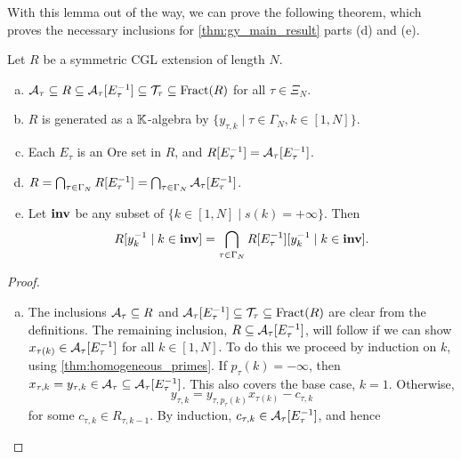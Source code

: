 {With this lemma out of the way, we can prove the following theorem, which proves the
necessary inclusions for \cref{thm:gy_main_result} parts (d) and (e).

\begin{theorem}\label{thm:intersections}
	Let $R$ be a symmetric CGL extension of length $N$.
	\begin{enumerate}[(a)]
		\item $\mathcal{A}_\tau \subseteq R \subseteq \mathcal{A}_\tau[E^{-1}_\tau]\subseteq \mathcal{T}_\tau \subseteq \operatorname{Fract}(R)$ for all $\tau \in \Xi_N$.
		\item $R$ is generated as a $\mathbb{K}$-algebra by $\{y_{\tau, k} \mid \tau \in \Gamma_N, k \in [1, N]\}$.
		\item Each $E_\tau$ is an Ore set in $R$, and $R[E^{-1}_\tau] = \mathcal{A}_\tau[E^{-1}_\tau]$.
		\item $R = \bigcap_{\tau \in \Gamma_N} R[E^{-1}_\tau] = \bigcap_{\tau\in\Gamma_N}\mathcal{A}_\tau[E^{-1}_\tau]$.
		\item Let $\mathbf{inv}$ be any subset of $\{k \in [1, N] \mid s(k) = +\infty \}$. Then
		      \begin{equation*}
			      R[y_k^{-1} \mid k \in \mathbf{inv}] = \bigcap_{\tau \in \Gamma_N} R[E^{-1}_\tau][y^{-1}_k \mid k \in \mathbf{inv}].
		      \end{equation*}
	\end{enumerate}
\end{theorem}
\begin{proof}
	\leavevmode
	\begin{enumerate}[(a)]
		\item The inclusions $\mathcal{A}_\tau \subseteq R$ and $\mathcal{A}_\tau[E^{-1}_\tau] \subseteq \mathcal{T}_\tau
			      \subseteq \operatorname{Fract}(R)$ are clear from the definitions. The remaining inclusion, $R
			      \subseteq \mathcal{A}_\tau[E^{-1}_\tau]$, will follow if we can show $x_{\tau(k)} \in
			      \mathcal{A}_\tau[E^{-1}_\tau]$ for all $k \in [1, N]$. To do this we proceed by induction on
		      $k$, using \cref{thm:homogeneous_primes}. If $p_\tau(k) = -\infty$, then $x_{\tau, k} =
			      y_{\tau, k} \in \mathcal{A}_\tau \subseteq \mathcal{A}_\tau[E^{-1}_\tau]$. This also covers the base
		      case, $k=1$. Otherwise,
		      \begin{equation*}
			      y_{\tau, k} = y_{\tau, p_\tau(k)}x_{\tau(k)} - c_{\tau, k}
		      \end{equation*}
		      for some $c_{\tau, k} \in R_{\tau, k-1}$. By induction, $c_{\tau, k} \in
			      \mathcal{A}_\tau[E^{-1}_\tau]$, and hence
		      \begin{equation*}

\end{equation*}
\end{enumerate}
\end{proof}}
